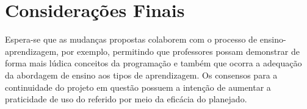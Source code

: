 \documentclass[12pt]{article}
\begin{document}
\section{Considerações Finais}
Espera-se que as mudanças propostas colaborem com o processo de ensino-aprendizagem, por exemplo, permitindo que professores possam demonstrar de forma mais lúdica conceitos da programação e também que ocorra a adequação da abordagem de ensino aos tipos de aprendizagem. 
Os consensos para a continuidade do projeto em questão possuem a intenção de aumentar a praticidade de uso do referido por meio da eficácia do planejado. 



\end{document}
